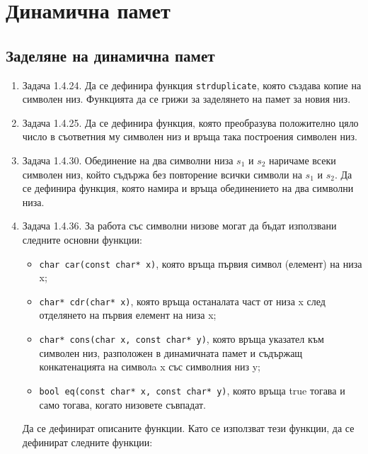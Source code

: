 {\pagebreak

\clearpage\section {Динамична памет}

\subsection {Заделяне на динамична памет}

\begin{enumerate}


\item Задача 1.4.24. \cite{sbornik} Да се дефинира функция \texttt{strduplicate}, която създава копие на символен низ. Функцията да се грижи за заделянето на памет за новия низ.

\item Задача 1.4.25.  \cite{sbornik}  Да се дефинира функция, която преобразува положително цяло число в съответния му символен низ и връща така построения символен низ.

\item Задача 1.4.30.  \cite{sbornik}  Обединение на два символни низа $s_1$ и $s_2$ наричаме всеки символен низ, който съдържа без повторение всички символи на $s_1$ и $s_2$. Да се дефинира функция, която намира и връща обединението на два символни низа.

\item Задача 1.4.36. За  \cite{sbornik}  работа със символни низове могат да бъдат използвани следните основни функции:

\begin{itemize}

\item \texttt{char car(const char* x)}, която връща първия символ (елемент) на низа x;
\item \texttt{char* cdr(char* x)}, която връща останалата част от низа x след отделянето на първия елемент на низа x;
\item \texttt{char* cons(char x, const char* y)}, която връща указател към символен низ, разположен в динамичната памет и съдържащ конкатенацията на символa x със символния низ y;

\item \texttt{bool eq(const char* x, const char* y)}, която връща true тогава и само тогава, когато низовете съвпадат.


\end{itemize}
Да се дефинират описаните функции. Като се използват тези функции, да се дефинират следните функции:


\end{enumerate}}
